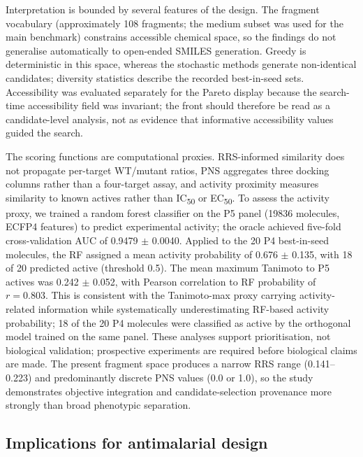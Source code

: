 \documentclass[10pt,a4paper]{article}
\begin{document}
Interpretation is bounded by several features of the design. The fragment vocabulary (approximately \num{108} fragments; the medium subset was used for the main benchmark) constrains accessible chemical space, so the findings do not generalise automatically to open-ended SMILES generation. Greedy is deterministic in this space, whereas the stochastic methods generate non-identical candidates; diversity statistics describe the recorded best-in-seed sets. Accessibility was evaluated separately for the Pareto display because the search-time accessibility field was invariant; the front should therefore be read as a candidate-level analysis, not as evidence that informative accessibility values guided the search.

The scoring functions are computational proxies. RRS-informed similarity does not propagate per-target WT/mutant ratios, PNS aggregates three docking columns rather than a four-target assay, and activity proximity measures similarity to known actives rather than IC\textsubscript{50} or EC\textsubscript{50}. To assess the activity proxy, we trained a random forest classifier on the P5 panel (\num{19836} molecules, ECFP4 features) to predict experimental activity; the oracle achieved five-fold cross-validation AUC of \num{0.9479} $\pm$ \num{0.0040}. Applied to the \num{20} P4 best-in-seed molecules, the RF assigned a mean activity probability of \num{0.676} $\pm$ \num{0.135}, with \num{18} of \num{20} predicted active (threshold \num{0.5}). The mean maximum Tanimoto to P5 actives was \num{0.242} $\pm$ \num{0.052}, with Pearson correlation to RF probability of $r = \num{0.803}$. This is consistent with the Tanimoto-max proxy carrying activity-related information while systematically underestimating RF-based activity probability; \num{18} of the \num{20} P4 molecules were classified as active by the orthogonal model trained on the same panel. These analyses support prioritisation, not biological validation; prospective experiments are required before biological claims are made. The present fragment space produces a narrow RRS range (\num{0.141}--\num{0.223}) and predominantly discrete PNS values (\num{0.0} or \num{1.0}), so the study demonstrates objective integration and candidate-selection provenance more strongly than broad phenotypic separation.

\subsection{Implications for antimalarial design}
\end{document}
